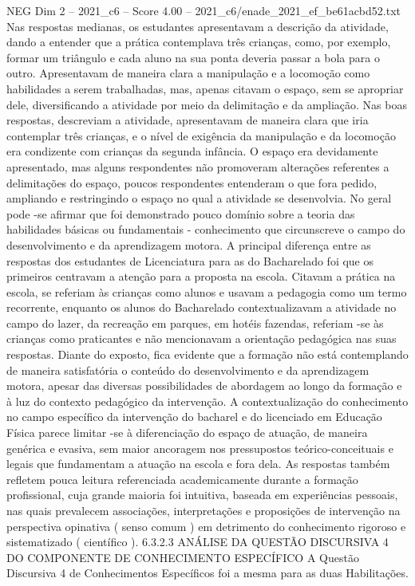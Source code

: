 \begin{textsample}{NEG Dim 2 – 2021\_c6 – Score 4.00 – 2021\_c6/enade\_2021\_ef\_be61acbd52.txt}
Nas respostas medianas, os estudantes apresentavam a descrição da atividade, dando a entender que a prática contemplava três crianças, como, por exemplo, formar um triângulo e cada aluno na sua ponta deveria passar a bola para o outro.
Apresentavam de maneira clara a manipulação e a locomoção como habilidades a serem trabalhadas, mas, apenas citavam o espaço, sem se apropriar dele, diversificando a atividade por meio da delimitação e da ampliação.
Nas boas respostas, descreviam a atividade, apresentavam de maneira clara que iria contemplar três crianças, e o nível de exigência da manipulação e da locomoção era condizente com crianças da segunda infância.
O espaço era devidamente apresentado, mas alguns respondentes não promoveram alterações referentes a delimitações do espaço, poucos respondentes entenderam o que fora pedido, ampliando e restringindo o espaço no qual a atividade se desenvolvia.
No geral pode -se afirmar que foi demonstrado pouco domínio sobre a teoria das habilidades básicas ou fundamentais - conhecimento que circunscreve o campo do desenvolvimento e da aprendizagem motora.
A principal diferença entre as respostas dos estudantes de Licenciatura para as do Bacharelado foi que os primeiros centravam a atenção para a proposta na escola.
Citavam a prática na escola, se referiam às crianças como alunos e usavam a pedagogia como um termo recorrente, enquanto os alunos do Bacharelado contextualizavam a atividade no campo do lazer, da recreação em parques, em hotéis fazendas, referiam -se às crianças como praticantes e não mencionavam a orientação pedagógica nas suas respostas.
Diante do exposto, fica evidente que a formação não está contemplando de maneira satisfatória o conteúdo do desenvolvimento e da aprendizagem motora, apesar das diversas possibilidades de abordagem ao longo da formação e à luz do contexto pedagógico da intervenção.
A contextualização do conhecimento no campo específico da intervenção do bacharel e do licenciado em Educação Física parece limitar -se à diferenciação do espaço de atuação, de maneira genérica e evasiva, sem maior ancoragem nos pressupostos teórico-conceituais e legais que fundamentam a atuação na escola e fora dela.
As respostas também refletem pouca leitura referenciada academicamente durante a formação profissional, cuja grande maioria foi intuitiva, baseada em experiências pessoais, nas quais prevalecem associações, interpretações e proposições de intervenção na perspectiva opinativa ( senso comum ) em detrimento do conhecimento rigoroso e sistematizado ( científico ). 6.3.2.3 ANÁLISE DA QUESTÃO DISCURSIVA 4 DO COMPONENTE DE CONHECIMENTO ESPECÍFICO A Questão Discursiva 4 de Conhecimentos Específicos foi a mesma para as duas Habilitações.

\end{textsample}
